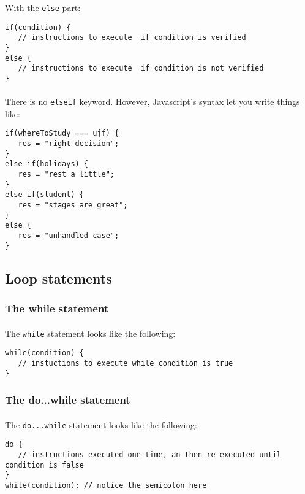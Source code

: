 \documentclass{article}
\begin{document}
\begin{sloppypar}
      With the \lstinline!else! part:
{\begin{lstlisting}
if(condition) {
   // instructions to execute  if condition is verified
}
else {
   // instructions to execute  if condition is not verified
}
\end{lstlisting}
}


      
\paragraph{}
There is no \lstinline!elseif! keyword. However, Javascript's syntax let you write things like:
{\begin{lstlisting}
if(whereToStudy === ujf) {
   res = "right decision";
}
else if(holidays) {
   res = "rest a little";
}
else if(student) {
   res = "stages are great";
}
else {
   res = "unhandled case";
}
\end{lstlisting}
}

   
   
   

\subsection{ Loop statements}



\subsubsection{ The while statement}


\paragraph{}
The \lstinline!while! statement looks like the following:
{\begin{lstlisting}
while(condition) {
   // instuctions to execute while condition is true
}
\end{lstlisting}
}

      
      
      

\subsubsection{ The do...while statement}


\paragraph{}
The \lstinline!do...while! statement looks like the following:
{\begin{lstlisting}
do {
   // instructions executed one time, an then re-executed until condition is false
}
while(condition); // notice the semicolon here
\end{lstlisting}
}


\end{sloppypar}
\end{document}
